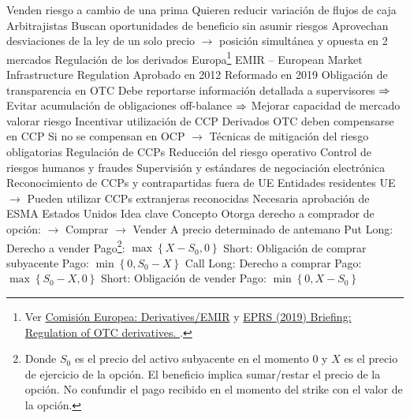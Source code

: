 \documentclass{nuevotema}
\begin{document}
\begin{esquemal}
				\4 Venden riesgo a cambio de una prima
				\4 Quieren reducir variación de flujos de caja
			\3 Arbitrajistas
				\4 Buscan oportunidades de beneficio
				\4[] sin asumir riesgos
				\4 Aprovechan desviaciones de la ley de un solo precio
				\4[] $\to$ posición simultánea y opuesta en 2 mercados
		\2 Regulación de los derivados
			\3 Europa\footnote{Ver \href{https://ec.europa.eu/info/business-economy-euro/banking-and-finance/financial-markets/post-trade-services/derivatives-emir_en}{Comisión Europea: Derivatives/EMIR} y \href{https://www.europarl.europa.eu/RegData/etudes/BRIE/2017/603983/EPRS_BRI(2017)603983_EN.pdf}{EPRS (2019) Briefing: Regulation of OTC derivatives. }.}
				\4 EMIR -- European Market Infrastructure Regulation
				\4[] Aprobado en 2012
				\4[] Reformado en 2019
				\4 Obligación de transparencia en OTC
				\4[] Debe reportarse información detallada a supervisores
				\4[] $\Rightarrow$ Evitar acumulación de obligaciones off-balance
				\4[] $\Rightarrow$ Mejorar capacidad de mercado valorar riesgo
				\4 Incentivar utilización de CCP
				\4[] Derivados OTC deben compensarse en CCP
				\4[] Si no se compensan en OCP
				\4[] $\to$ Técnicas de mitigación del riesgo obligatorias
				\4[] Regulación de CCPs
				\4 Reducción del riesgo operativo
				\4[] Control de riesgos humanos y fraudes
				\4[] Supervisión y estándares de negociación electrónica
				\4 Reconocimiento de CCPs y contrapartidas fuera de UE
				\4[] Entidades residentes UE
				\4[] $\to$ Pueden utilizar CCPs extranjeras reconocidas
				\4[] Necesaria aprobación de ESMA
			\3 Estados Unidos
	\1 
		\2 Idea clave
			\3 Concepto
				\4 Otorga derecho a comprador de opción:
				\4[] $\to$ Comprar
				\4[] $\to$ Vender
				\4 A precio determinado de antemano
			\3 Put
				\4 Long:
				\4[] Derecho a vender
				\4[] Pago\footnote{Donde $S_0$ es el precio del activo subyacente en el momento 0 y $X$ es el precio de ejercicio de la opción. El beneficio implica sumar/restar el precio de la opción. No confundir el pago recibido en el momento del strike con el valor de la opción.}: $\max \left\lbrace X - S_0, 0 \right\rbrace$
				\4[] 
				\4 Short:
				\4[] Obligación de comprar subyacente
				\4[] Pago: $\min \left\lbrace 0, S_0 - X \right\rbrace$
				\4[] 
			\3 Call
				\4 Long:
				\4[] Derecho a comprar
				\4[] Pago: $\max \left\lbrace S_0 - X , 0 \right\rbrace$
				\4[] 
				\4 Short:
				\4[] Obligación de vender
				\4[] Pago: $\min \left\lbrace 0, X - S_0 \right\rbrace$
				\4[] 

\end{esquemal}
\end{document}
